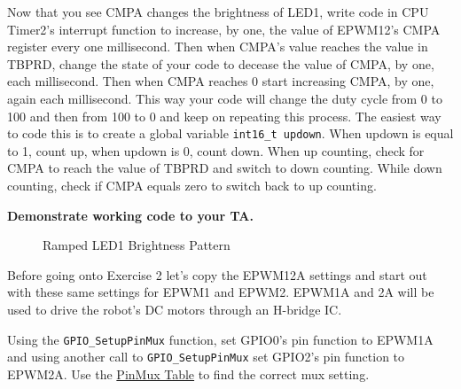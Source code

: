 \documentclass[11pt]{article}
\begin{document}
Now that you see CMPA changes the brightness of LED1, write code in CPU Timer2’s interrupt function to increase, by one, the value of EPWM12’s CMPA register every one millisecond. Then when CMPA’s value reaches the value in TBPRD, change the state of your code to decease the value of CMPA, by one, each millisecond. Then when CMPA reaches 0 start increasing CMPA, by one, again each millisecond. This way your code will change the duty cycle from 0 to 100 and then from 100 to 0 and keep on repeating this process. The easiest way to code this is to create a global variable \texttt{int16_t updown}. When updown is equal to 1, count up, when updown is 0, count down. When up counting, check for CMPA to reach the value of TBPRD and switch to down counting. While down counting, check if CMPA equals zero to switch back to up counting.
%
\begin{checkoff}
        \textbf{Demonstrate working code to your TA.}
\end{checkoff}
%
\begin{figure}[H]
    \centering
    \AltEnd
    \caption{Ramped LED1 Brightness Pattern}
\end{figure}
%
Before going onto Exercise 2 let’s copy the EPWM12A settings and start out with these same settings for EPWM1 and EPWM2. EPWM1A and 2A will be used to drive the robot’s DC motors through an H-bridge IC.

Using the \texttt{GPIO_SetupPinMux} function, set GPIO0’s pin function to EPWM1A and using another call to \texttt{GPIO_SetupPinMux} set GPIO2’s pin function to EPWM2A. Use the \href{http://coecsl.ece.illinois.edu/se423/Lab_PinMuxTableF28379DLaunchPadSE423Robot.pdf}{PinMux Table} to find the correct mux setting.
\end{document}
